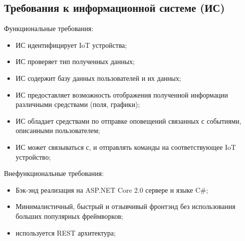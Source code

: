 \documentclass[12pt]{article}
\begin{document}
    \subsection{Требования к информационной системе (ИС)}
    Функциональные требования:
    \begin{itemize}
        \item ИС идентифицирует IoT устройства; 
        \item ИС проверяет тип полученных данных;
        \item ИС содержит базу данных пользователей и их данных;
        \item ИС предоставляет возможность отображения полученной информации различными средствами (поля, графики);
        \item ИС обладает средствами по отправке оповещений связанных с событиями, описанными пользователем;
        \item ИС может связываться с, и отправлять команды на соответствующее IoT устройство;
    \end{itemize}
    Внефункциональные требования:
    \begin{itemize}
        \item Бэк-энд реализация на ASP.NET Core 2.0 сервере и языке C\#;
        \item Минималистичный, быстрый и отзывчивый фронтэнд без использования больших популярных
         фреймворков;
        \item используется REST архитектура;
    \end{itemize}
\end{document}
